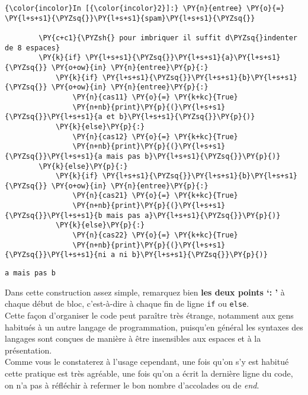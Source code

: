     \begin{Verbatim}[commandchars=\\\{\}]
{\color{incolor}In [{\color{incolor}2}]:} \PY{n}{entree} \PY{o}{=} \PY{l+s+s1}{\PYZsq{}}\PY{l+s+s1}{spam}\PY{l+s+s1}{\PYZsq{}}
        
        \PY{c+c1}{\PYZsh{} pour imbriquer il suffit d\PYZsq{}indenter de 8 espaces}
        \PY{k}{if} \PY{l+s+s1}{\PYZsq{}}\PY{l+s+s1}{a}\PY{l+s+s1}{\PYZsq{}} \PY{o+ow}{in} \PY{n}{entree}\PY{p}{:}
            \PY{k}{if} \PY{l+s+s1}{\PYZsq{}}\PY{l+s+s1}{b}\PY{l+s+s1}{\PYZsq{}} \PY{o+ow}{in} \PY{n}{entree}\PY{p}{:}
                \PY{n}{cas11} \PY{o}{=} \PY{k+kc}{True}
                \PY{n+nb}{print}\PY{p}{(}\PY{l+s+s1}{\PYZsq{}}\PY{l+s+s1}{a et b}\PY{l+s+s1}{\PYZsq{}}\PY{p}{)}
            \PY{k}{else}\PY{p}{:}
                \PY{n}{cas12} \PY{o}{=} \PY{k+kc}{True}
                \PY{n+nb}{print}\PY{p}{(}\PY{l+s+s1}{\PYZsq{}}\PY{l+s+s1}{a mais pas b}\PY{l+s+s1}{\PYZsq{}}\PY{p}{)}
        \PY{k}{else}\PY{p}{:}
            \PY{k}{if} \PY{l+s+s1}{\PYZsq{}}\PY{l+s+s1}{b}\PY{l+s+s1}{\PYZsq{}} \PY{o+ow}{in} \PY{n}{entree}\PY{p}{:}
                \PY{n}{cas21} \PY{o}{=} \PY{k+kc}{True}
                \PY{n+nb}{print}\PY{p}{(}\PY{l+s+s1}{\PYZsq{}}\PY{l+s+s1}{b mais pas a}\PY{l+s+s1}{\PYZsq{}}\PY{p}{)}
            \PY{k}{else}\PY{p}{:}
                \PY{n}{cas22} \PY{o}{=} \PY{k+kc}{True}
                \PY{n+nb}{print}\PY{p}{(}\PY{l+s+s1}{\PYZsq{}}\PY{l+s+s1}{ni a ni b}\PY{l+s+s1}{\PYZsq{}}\PY{p}{)}
\end{Verbatim}


    \begin{Verbatim}[commandchars=\\\{\}]
a mais pas b

    \end{Verbatim}

    Dans cette construction assez simple, remarquez bien \textbf{les deux
points `: '} à chaque début de bloc, c'est-à-dire à chaque fin de ligne
\texttt{if} ou \texttt{else}.\\

    Cette façon d'organiser le code peut paraître très étrange, notamment
aux gens habitués à un autre langage de programmation, puisqu'en général
les syntaxes des langages sont conçues de manière à être insensibles aux
espaces et à la présentation.\\

Comme vous le constaterez à l'usage cependant, une fois qu'on s'y est
habitué cette pratique est très agréable, une fois qu'on a écrit la
dernière ligne du code, on n'a pas à réfléchir à refermer le bon nombre
d'accolades ou de \emph{end}.\\

